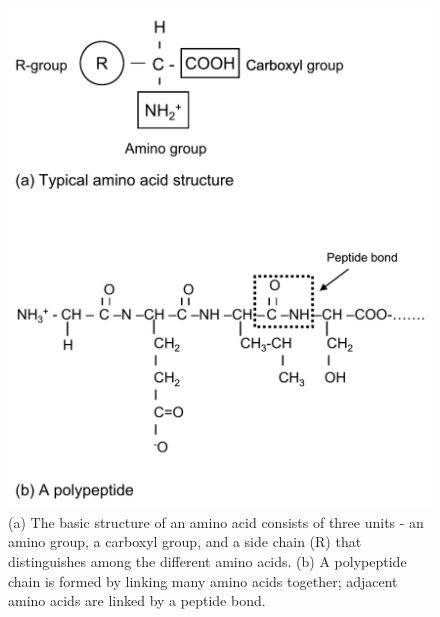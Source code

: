 \documentclass[11pt,ignorenonframetext,aspectratio=169]{beamer}
\begin{document}
\begin{frame}{}
\protect\hypertarget{section-27}{}
\begin{figure}
\includegraphics[width=0.45\linewidth]{../images/polypeptides_amino_acid} \caption{(a) The basic structure of an amino acid consists of three units - an amino group, a carboxyl group, and a side chain (R) that distinguishes among the different amino acids. (b) A polypeptide chain is formed by linking many amino acids together; adjacent amino acids are linked by a peptide bond.}\label{fig:polypeptides-amino}
\end{figure}
\end{frame}
\end{document}
